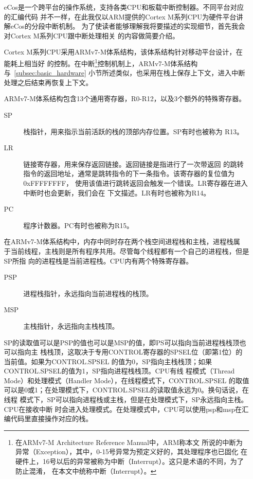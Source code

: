 eCos是一个跨平台的操作系统，支持各类CPU和板载中断控制器。不同平台对应的汇编代码
并不一样，在此我仅以ARM提供的Cortex M系列CPU为硬件平台讲解eCos的分段中断机制。
为了使读者能够理解我将要描述的实现细节，首先我会对Cortex M系列CPU跟中断处理相关
的内容做简要介绍。

Cortex M系列CPU采用ARMv7-M体系结构，该体系结构针对移动平台设计，在能耗上相当好
的控制。在中断\footnote{在ARMv7-M Architecture Reference Manual中，ARM称本文
所说的中断为异常（Exception），其中，0-15号异常为预定义好的，其处理程序也已固化
在硬件上，16号以后的异常被称为中断（Interrupt）。这只是术语的不同，为了防止混淆，
在本文中统称中断（Interrupt）。}控制机制上，ARMv7-M体系结构与~\ref{subsec:basic_hardware}
小节所述类似，也采用在栈上保存上下文，进入中断处理之后结束再恢复上下文。

ARMv7-M体系结构包含13个通用寄存器，R0-R12，以及3个额外的特殊寄存器。

\begin{description}
	\item[SP] 栈指针，用来指示当前活跃的栈的顶部内存位置。SP有时也被称为
	R13。
	\item[LR] 链接寄存器，用来保存返回链接。返回链接是指进行了一次带返回
	的跳转指令的返回地址，通常是跳转指令的下一条指令。该寄存器的复位值为0xFFFFFFFF，
	使用该值进行跳转返回会触发一个错误。LR寄存器在进入中断时也会更新，我们会在
	下文描述。LR有时也被称为R14。
	\item[PC] 程序计数器。PC有时也被称为R15。
\end{description}

在ARMv7-M体系结构中，内存中同时存在两个栈空间\pozhehao 进程栈和主栈，进程栈属
于当前线程，主栈则是所有程序共用。尽管每个线程都有一个自己的进程栈，但是SP所指
向的进程栈是当前进程栈。CPU内有两个特殊寄存器。

\begin{description}
	\item[PSP] 进程栈指针，永远指向当前进程栈的栈顶。
	\item[MSP] 主栈指针，永远指向主栈栈顶。
\end{description}

SP的读取值可以是PSP的值也可以是MSP的值，即PS可以指向当前进程栈栈顶也可以指向主
栈栈顶，这取决于专用CONTROL寄存器的SPSEL位（即第1位）的当前值。如果为CONTROL.SPSEL
的值为0，SP指向主栈栈顶；如果CONTROL.SPSEL的值为1，SP指向进程栈栈顶。CPU有线
程模式（Thread Mode）和处理模式（Handler Mode），在线程模式下，CONTROL.SPSEL
的取值可以是0或1；在处理模式下，CONTROL.SPSEL的读取值永远为0。换句话说，在线程
模式下，SP可以指向进程栈或主栈，但是在处理模式下，SP永远指向主栈。CPU在接收中断
时会进入处理模式。在处理模式中，CPU可以使用psp和msp在汇编代码里直接操作对应的栈。

